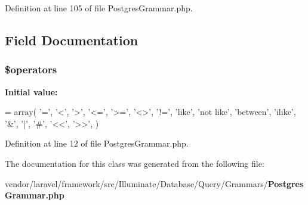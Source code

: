 Definition at line 105 of file Postgres\+Grammar.\+php.



\subsection{Field Documentation}
\subsubsection[{\$operators}]{\setlength{\rightskip}{0pt plus 5cm}\$operators\hspace{0.3cm}{\ttfamily [protected]}}\label{class_illuminate_1_1_database_1_1_query_1_1_grammars_1_1_postgres_grammar_a1a526a18e63270ba6814d699637f22bf}
{\bfseries Initial value\+:}
\begin{DoxyCode}
= array(
        \textcolor{charliteral}{'='}, \textcolor{charliteral}{'<'}, \textcolor{charliteral}{'>'}, \textcolor{stringliteral}{'<='}, \textcolor{stringliteral}{'>='}, \textcolor{stringliteral}{'<>'}, \textcolor{stringliteral}{'!='},
        \textcolor{stringliteral}{'like'}, \textcolor{stringliteral}{'not like'}, \textcolor{stringliteral}{'between'}, \textcolor{stringliteral}{'ilike'},
        \textcolor{charliteral}{'&'}, \textcolor{charliteral}{'|'}, \textcolor{charliteral}{'#'}, \textcolor{stringliteral}{'<<'}, \textcolor{stringliteral}{'>>'},
    )
\end{DoxyCode}


Definition at line 12 of file Postgres\+Grammar.\+php.



The documentation for this class was generated from the following file\+:\begin{DoxyCompactItemize}
\item 
vendor/laravel/framework/src/\+Illuminate/\+Database/\+Query/\+Grammars/{\bf Postgres\+Grammar.\+php}\end{DoxyCompactItemize}
